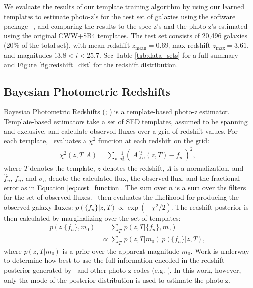
\label{sect:photoz}

We evaluate the results of our template training algorithm by using our learned templates to estimate photo-z's for the test set of galaxies using the software package \bpz\ \citep{Benitez2000a}, and comparing the results to the spec-z's and the photo-z's estimated using the original CWW+SB4 templates.
The test set consists of 20,496 galaxies (20\% of the total set), with mean redshift $z_\text{mean} = 0.69$, max redshift $z_\text{max} = 3.61$, and magnitudes $13.8 < i < 25.7$.
See Table \ref{tab:data_sets} for a full summary and Figure \ref{fig:redshift_dist} for the redshift distribution.

\subsection{Bayesian Photometric Redshifts}
\label{sect:bpz}

Bayesian Photometric Redshifts (\bpz; \citealt{Benitez2000a}) is a template-based photo-z estimator.
Template-based estimators take a set of SED templates, assumed to be spanning and exclusive, and calculate observed fluxes over a grid of redshift values.
For each template, \bpz\ evaluates a $\chi^2$ function at each redshift on the grid:
\begin{align}
    \chi^2 (z,T,A) = \sum_n \frac{1}{\sigma_n^2} (\, A \, \hat{f}_n(z,T) - f_n \,)^2,
    \label{eq:chi2}
\end{align}
where $T$ denotes the template, $z$ denotes the redshift, $A$ is a normalization, and $\hat{f}_n$, $f_n$, and $\sigma_n$ denote the calculated flux, the observed flux, and the fractional error as in Equation \ref{eq:cost_function}. 
The sum over $n$ is a sum over the filters for the set of observed fluxes. 
\bpz\ then evaluates the likelihood for producing the observed galaxy fluxes: $p(\{f_n\}|z,T) \propto \exp{(-\chi^2/2)}$. 
The redshift posterior is then calculated by marginalizing over the set of templates:
\begin{align}
    p(z|\{f_n\},m_0) &= \sum_T \, p(z,T|\{f_n\},m_0) \nonumber \\
                     &\propto \sum_T \, p(z,T|m_0) \, p(\{f_n\}|z,T),
\end{align}
where $p(z,T|m_0)$ is a prior over the apparent magnitude $m_0$. 
Work is underway to determine how best to use the full information encoded in the redshift posterior generated by \bpz\ and other photo-z codes (e.g. \citealt{Schmidt2020}). 
In this work, however, only the mode of the posterior distribution is used to estimate the photo-z.

